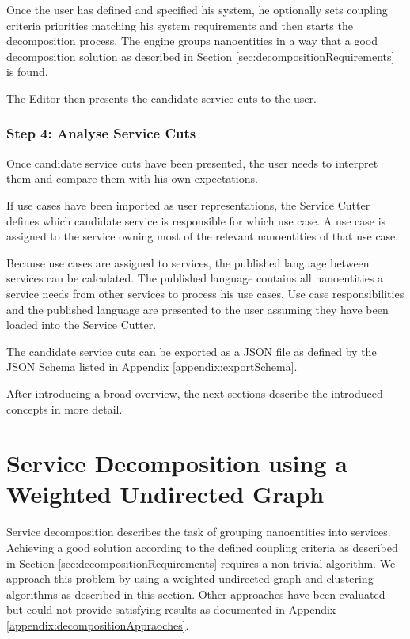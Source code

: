 Once the user has defined and specified his system, he optionally sets coupling criteria priorities matching his system requirements and then starts the decomposition process. The engine groups nanoentities in a way that a good decomposition solution as described in Section \ref{sec:decompositionRequirements} is found. 

The Editor then presents the candidate service cuts to the user.

\subsubsection{Step 4: Analyse Service Cuts}

Once candidate service cuts have been presented, the user needs to interpret them and compare them with his own expectations. 

If use cases have been imported as user representations, the Service Cutter defines which candidate service is responsible for which use case. A use case is assigned to the service owning most of the relevant nanoentities of that use case. 

Because use cases are assigned to services, the published language between services can be calculated. The published language contains all nanoentities a service needs from other services to process his use cases. Use case responsibilities and the published language are presented to the user assuming they have been loaded into the Service Cutter. 

The candidate service cuts can be exported as a \gls{JSON} file as defined by the \gls{JSON} Schema listed in Appendix \ref{appendix:exportSchema}.

\bigskip

After introducing a broad overview, the next sections describe the introduced concepts in more detail. 
 
\section{Service Decomposition using a Weighted Undirected Graph}
\label{subsec:approach1_graph}

Service decomposition describes the task of grouping nanoentities into services. Achieving a good solution according to the defined coupling criteria as described in Section \ref{sec:decompositionRequirements} requires a non trivial algorithm. We approach this problem by using a weighted undirected graph and clustering algorithms as described in this section. Other approaches have been evaluated but could not provide satisfying results as documented in Appendix \ref{appendix:decompositionAppraoches}.

